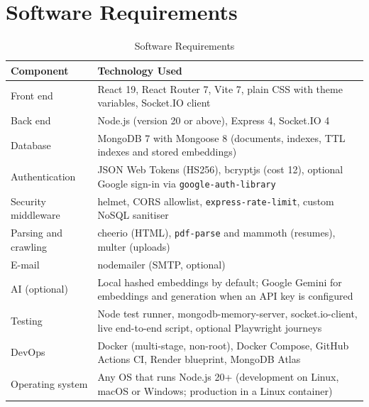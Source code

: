 \documentclass[12pt,a4paper]{report}
\begin{document}
\section{Software Requirements}
\begin{table}[H]
\centering
\caption{Software Requirements}
\begin{tabularx}{\textwidth}{|l|X|}
\hline
\textbf{Component} & \textbf{Technology Used} \\
\hline
Front end & React 19, React Router 7, Vite 7, plain CSS with theme variables, Socket.IO client \\
\hline
Back end & Node.js (version 20 or above), Express 4, Socket.IO 4 \\
\hline
Database & MongoDB 7 with Mongoose 8 (documents, indexes, TTL indexes and stored embeddings) \\
\hline
Authentication & JSON Web Tokens (HS256), bcryptjs (cost 12), optional Google sign-in via \texttt{google-auth-library} \\
\hline
Security middleware & helmet, CORS allowlist, \texttt{express-rate-limit}, custom NoSQL sanitiser \\
\hline
Parsing and crawling & cheerio (HTML), \texttt{pdf-parse} and mammoth (resumes), multer (uploads) \\
\hline
E-mail & nodemailer (SMTP, optional) \\
\hline
AI (optional) & Local hashed embeddings by default; Google Gemini for embeddings and generation when an API key is configured \\
\hline
Testing & Node test runner, mongodb-memory-server, socket.io-client, live end-to-end script, optional Playwright journeys \\
\hline
DevOps & Docker (multi-stage, non-root), Docker Compose, GitHub Actions CI, Render blueprint, MongoDB Atlas \\
\hline
Operating system & Any OS that runs Node.js 20+ (development on Linux, macOS or Windows; production in a Linux container) \\
\hline
\end{tabularx}
\end{table}
\end{document}
